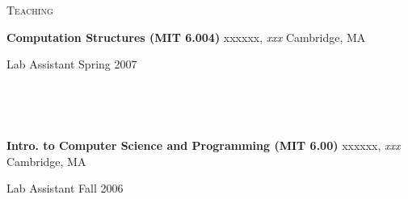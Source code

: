 \documentclass[10pt,minionpro]{report}
\newlength{\sectiongap}
\newlength{\entrygap}
\newlength{\sectioncolwidth}
\newlength{\colgap}
\newlength{\stuffwidth}
\def\ifEqString#1#2{\def\testa{#1}\def\testb{#2}%
  \ifx\testa\testb}
\newenvironment{rtable}{
  \begin{minipage}{\textwidth}
  }{
  \end{minipage}
}
\newenvironment{rentry}[3][xxx]{
  \begin{minipage}[t]{\hsize}
    \textbf{#2}\ifEqString{#1}{xxx}\relax\else, \textit{#1}\fi
    \hspace{\stretch{1}} #3 \\
  }{
    \removelastskip
  \end{minipage}
  \\[\entrygap]  %
}
\newcommand{\rline}[2]{
  \begin{minipage}[t]{\hsize}
    #1 \hspace{\stretch{1}} #2
  \end{minipage} \\
}
\newenvironment{rsection}[1]{
  \begin{minipage}[t]{\sectioncolwidth}
    \textsc{#1}
  \end{minipage}
  \hspace{\colgap}
  \begin{minipage}[t]{\stuffwidth}
  }{
    \removelastskip
  \end{minipage}
  \\[\sectiongap]
}
\begin{document}
\begin{rtable}
\begin{rsection}{Teaching}
\begin{rentry}{Computation Structures (MIT 6.004)}{Cambridge, MA}
      \rline{Lab Assistant}{Spring 2007}
      \vspace{-0.5em}
    \end{rentry}
    \begin{rentry}{Intro. to Computer Science and
        Programming (MIT 6.00)}{Cambridge, MA}
      \rline{Lab Assistant}{Fall 2006}
      \vspace{-1em}
    \end{rentry}
  \end{rsection}


\end{rtable}
\end{document}
